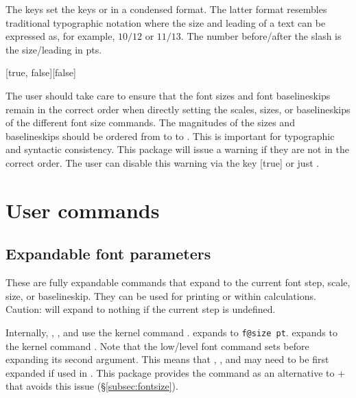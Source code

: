 \documentclass{beery}
\begin{document}
The keys  set the keys  or  in a condensed format.
The latter format resembles traditional typographic notation where the size and leading of a text can be expressed as, for example, $10/12$ or $11/13$.
The number before/after the slash is the size/leading in \unit{pts}.

[true, false][false]
\KeepNextPar*

The user should take care to ensure that the font sizes and font baselineskips remain in the correct order when directly setting the scales, sizes, or baselineskips of the different font size commands.
The magnitudes of the sizes and baselineskips should be ordered from  to  to .
This is important for typographic and syntactic consistency.
This package will issue a warning if they are not in the correct order.
The user can disable this warning via the key [true] or just .


\section{User commands}
\label{sec:usercommands}

\subsection{Expandable font parameters}
\label{subsec:fontparameters}

\nopagebreak\newline
{}
\newline
{}
\nopagebreak\newline
{}

These are fully expandable commands that expand to the current font step, scale, size, or baselineskip.
They can be used for printing or within calculations.
Caution:  will expand to nothing if the current step is undefined.

Internally, , , and  use the kernel command .
 expands to \texttt{f@size pt}.
 expands to the kernel command .
Note that the low\-/level font command  sets  before expanding its second argument.
This means that , , and  may need to be first expanded if used in .
This package provides the command  as an alternative to  +  that avoids this issue (\S\ref{subsec:fontsize}).
\end{document}
